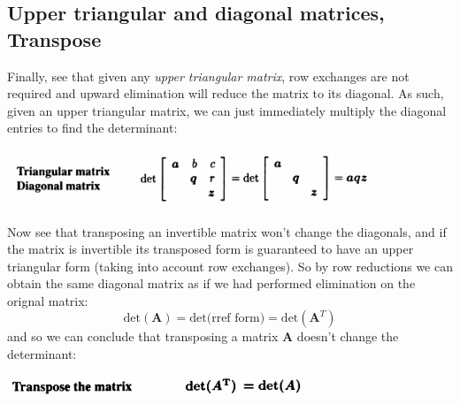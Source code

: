 \documentclass{report}
\begin{document}
\subsection{Upper triangular and diagonal matrices, Transpose}
Finally, see that given any \textit{upper triangular matrix}, row exchanges are not required and upward elimination will reduce the matrix to its diagonal. As such, given an
upper triangular matrix, we can just immediately multiply the diagonal entries to find the determinant:
\begin{center}
\includegraphics[width=11cm]{95}
\end{center}
Now see that transposing an invertible matrix won't change the diagonals, and if the matrix is invertible its transposed form
is guaranteed to have an upper triangular form (taking
into account row exchanges). So by row reductions we can obtain the same diagonal matrix as if we had performed elimination on the orignal matrix:
\begin{equation*}
\text{det}(\bm A)=\text{det(rref form)}=\text{det}(\bm A^T)
\end{equation*}
and so we can conclude that transposing a matrix $\bm A$ doesn't change the determinant:
\begin{center}
\includegraphics[width=9cm]{96}
\end{center}
\end{document}
